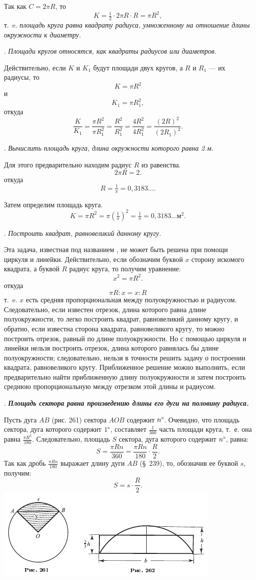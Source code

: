 \documentclass[oneside]{book}
\begin{document}
Так как $C=2\pi R$, то
\[K=\tfrac12\cdot 2\pi  R\cdot R=\pi R^2,\]
т.~e. \emph{площадь круга равна квадрату радиуса, умноженному на отношение длины окружности к диаметру.}

.
\emph{Площади кругов относятся, как квадраты радиусов или диаметров.}

Действительно, если $K$ и $K_1$ будут площади двух кругов, а $R$ и $R_1$ — их радиусы, то
\[K=\pi R^2\]
и
\[K_1=\pi R_1^2,\]
откуда
\[\frac{K}{K_1}=\frac{\pi R^2}{\pi R^2_1}=\frac{R^2}{R^2_1}=\frac{4R^2}{4R^2_1}=\frac{(2R)^2}{(2R_1)^2}.\]

.
\emph{Вычислить площадь круга, длина окружности которого равна 2 м.}

Для этого предварительно находим радиус $R$ из равенства.
\[2\pi R= 2.\]
откуда
\[R=\tfrac1\pi=0{,}3183\dots.\]

Затем определим площадь круга.
\[K=\pi R^2=\pi(\tfrac1\pi)^2=\tfrac1\pi=0{,}3183\dots\text{м}^2.\]

.
\emph{Построить квадрат, равновеликий данному кругу.}

Эта задача, известная под названием , не может быть решена при помощи циркуля и линейки.
Действительно, если обозначим буквой $x$ сторону искомого квадрата, а буквой $R$ радиус круга, то получим уравнение:
\[x^2=\pi R^2.\]
откуда
\[\pi R:x=x:R\]
т.~e.
$x$ есть средняя пропорциональная между полуокружностью и радиусом.
Следовательно, если известен отрезок, длина которого равна длине полуокружности, то легко построить квадрат, равновеликий данному кругу, и обратно, если известна сторона квадрата, равновеликого кругу, то можно построить отрезок, равный по длине полуокружности.
Но с помощью циркуля и линейки нельзя построить отрезок, длина которого равнялась бы длине полуокружности;
следовательно, нельзя в точности решить задачу о построении квадрата, равновеликого кругу.
Приближенное решение можно выполнить, если предварительно найти приближенную длину полуокружности и затем построить среднюю пропорциональную между отрезком этой длины и радиусом.

.
\textbf{\emph{Площадь сектора равна произведению длины его дуги на половину радиуса.}}

Пусть дуга $AB$ (рис. 261) сектора $AOB$ содержит $n\degree$.
Очевидно, что площадь сектора, дуга которого содержит $1\degree$, составляет $\tfrac1{360}$ часть площади круга, т.~е. она равна $\frac{\pi R^2}{180}$.
Следовательно, площадь $S$ сектора, дуга которого содержит $n\degree$, равна:
\[S=\frac{\pi R n}{360}=\frac{\pi R n}{180}\cdot \frac R2.\]
Так как дробь $\frac{\pi R n}{180}$ выражает длину дуги $AB$ (§~239), то, обозначив
ее буквой $s$, получим:
\[S=s\cdot \frac R2.\]
\includegraphics{pics/ris-261-262}
\end{document}
